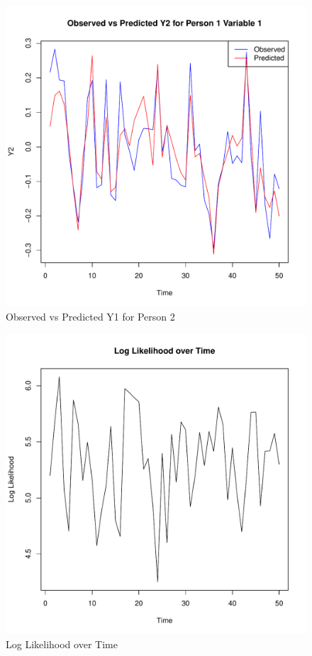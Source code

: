 \documentclass{article}
\begin{document}
\begin{figure}[h]
  \centering
  \includegraphics[width=\textwidth]{predicted_vs_observed_y2.pdf}
  \caption{Observed vs Predicted Y1 for Person 2}
\end{figure}

\begin{figure}[h]
  \centering
  \includegraphics[width=\textwidth]{log_likelihood_over_time.pdf}
  \caption{Log Likelihood over Time}
\end{figure}
\end{document}
